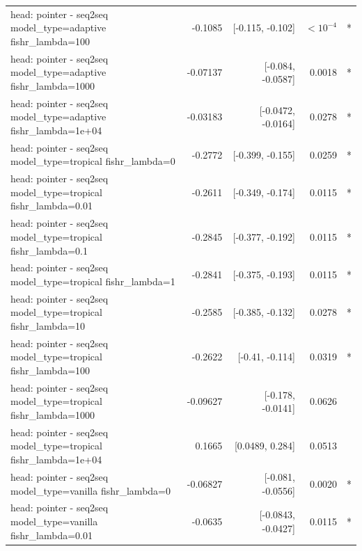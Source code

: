 \documentclass[10pt]{article}
\makeatletter
\newcommand{\stackcell}[1]{\begin{tabular}[t]{@{}l@{}}#1\end{tabular}}
\makeatother
\begin{document}
{\begin{longtable}{lrrrl}
\stackcell{head: pointer - seq2seq\\\footnotesize model\_type=adaptive fishr\_lambda=100 } & -0.1085 & [-0.115, -0.102] & $<10^{-4}$ & *\\
\stackcell{head: pointer - seq2seq\\\footnotesize model\_type=adaptive fishr\_lambda=1000 } & -0.07137 & [-0.084, -0.0587] & 0.0018 & *\\
\stackcell{head: pointer - seq2seq\\\footnotesize model\_type=adaptive fishr\_lambda=1e+04 } & -0.03183 & [-0.0472, -0.0164] & 0.0278 & *\\
\stackcell{head: pointer - seq2seq\\\footnotesize model\_type=tropical fishr\_lambda=0 } & -0.2772 & [-0.399, -0.155] & 0.0259 & *\\
\stackcell{head: pointer - seq2seq\\\footnotesize model\_type=tropical fishr\_lambda=0.01 } & -0.2611 & [-0.349, -0.174] & 0.0115 & *\\
\stackcell{head: pointer - seq2seq\\\footnotesize model\_type=tropical fishr\_lambda=0.1 } & -0.2845 & [-0.377, -0.192] & 0.0115 & *\\
\stackcell{head: pointer - seq2seq\\\footnotesize model\_type=tropical fishr\_lambda=1 } & -0.2841 & [-0.375, -0.193] & 0.0115 & *\\
\stackcell{head: pointer - seq2seq\\\footnotesize model\_type=tropical fishr\_lambda=10 } & -0.2585 & [-0.385, -0.132] & 0.0278 & *\\
\stackcell{head: pointer - seq2seq\\\footnotesize model\_type=tropical fishr\_lambda=100 } & -0.2622 & [-0.41, -0.114] & 0.0319 & *\\
\stackcell{head: pointer - seq2seq\\\footnotesize model\_type=tropical fishr\_lambda=1000 } & -0.09627 & [-0.178, -0.0141] & 0.0626 & \\
\stackcell{head: pointer - seq2seq\\\footnotesize model\_type=tropical fishr\_lambda=1e+04 } & 0.1665 & [0.0489, 0.284] & 0.0513 & \\
\stackcell{head: pointer - seq2seq\\\footnotesize model\_type=vanilla fishr\_lambda=0 } & -0.06827 & [-0.081, -0.0556] & 0.0020 & *\\
\stackcell{head: pointer - seq2seq\\\footnotesize model\_type=vanilla fishr\_lambda=0.01 } & -0.0635 & [-0.0843, -0.0427] & 0.0115 & *\\

\end{longtable}}
\end{document}
